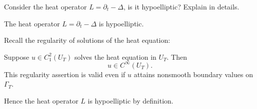 \begin{pro}
  Consider the heat operator $L=\partial_t-\Delta$,
  is it hypoelliptic?
  Explain in details.
\end{pro}
\begin{sol}
  The heat operator $L=\partial_t-\Delta$ is hypoelliptic.

  Recall the regularity of solutions of the heat equation:
  \begin{thm}[Smoothness]
    Suppose $u\in C_1^2(U_T)$ solves the heat equation in $U_T$.
    Then
    \begin{displaymath}
      u\in C^{\infty}(U_T).
    \end{displaymath}
    This regularity assertion is valid even if $u$ attains nonsmooth boundary values on
    $\Gamma_T$.
  \end{thm}
  Hence the heat operator $L$ is hypoelliptic by definition.
\end{sol}
